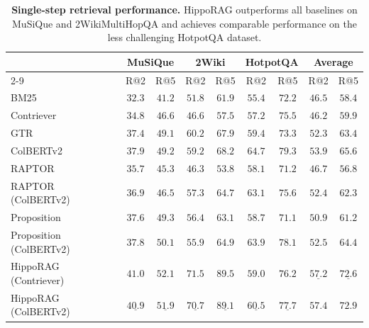 \documentclass{article}
\begin{document}
\begin{table}[t]
\small
  \caption{\textbf{Single-step retrieval performance.} HippoRAG outperforms all baselines on MuSiQue and 2WikiMultiHopQA and achieves comparable performance on the less challenging HotpotQA dataset.}
  \label{tab:single_retrieve}
  \centering
  \small
\begin{tabular}{@{}lcccccc|cc@{}}
\toprule
             & \multicolumn{2}{c}{\textbf{MuSiQue}} & \multicolumn{2}{c}{\textbf{2Wiki}} & \multicolumn{2}{c}{\textbf{HotpotQA}} & \multicolumn{2}{c}{\textbf{Average}}\\ \cmidrule(l){2-9} 
             & R@2   & R@5     & R@2      & R@5       & R@2    & R@5   & R@2  & R@5                         \\ \midrule
BM25~\cite{bm25}         & $32.3$      & $41.2$    & $51.8$                & $61.9$            & $55.4$          & $72.2$ & $46.5$ & $58.4$        \\ 
Contriever~\cite{contriever} & $34.8$    & $46.6$       & $46.6$           & $57.5$     & $57.2$       & $75.5$ & $46.2$ & $59.9$       \\
GTR~\cite{gtr} & $37.4$ & $49.1$ & $60.2$ & $67.9$ & $59.4$ & $73.3$ & $52.3$ & $63.4$ \\
ColBERTv2~\cite{colbertv2} & $37.9$        & $49.2$            & $59.2$               & $68.2$            & $\mathbf{64.7}$              & $\mathbf{79.3}$ & $53.9$ & $65.6$            \\ 
RAPTOR~\cite{raptor} & $35.7$ & $45.3$ & $46.3$ & $53.8$ & $58.1$ & $71.2$ & $46.7$ & $56.8$ \\ 
RAPTOR (ColBERTv2) & $36.9$ & $46.5$ & $57.3$ & $64.7$ & $63.1$ & $75.6$ & $52.4$ & $62.3$ \\
Proposition~\cite{densex} & $37.6$ & $49.3$ & $56.4$ & $63.1$ & $58.7$ & $71.1$ & $50.9$ & $61.2$ \\
Proposition (ColBERTv2) & $37.8$ & $50.1$ & $55.9$ & $64.9$ & $63.9$ & $78.1$ & $52.5$	& $64.4$ \\ \midrule
HippoRAG (Contriever) & $\mathbf{41.0}$ & $\mathbf{52.1}$ & $\mathbf{71.5}$ & $\mathbf{89.5}$ & $59.0$ & $76.2$ & $\underline{57.2}$ & $\underline{72.6}$ \\
HippoRAG (ColBERTv2) & $\underline{40.9}$ & $\underline{51.9}$ & $\underline{70.7}$ & $\underline{89.1}$ & $\underline{60.5}$ & $\underline{77.7}$ & $\mathbf{57.4}$ & $\mathbf{72.9}$  \\ \midrule
\end{tabular}
\end{table}
\end{document}
